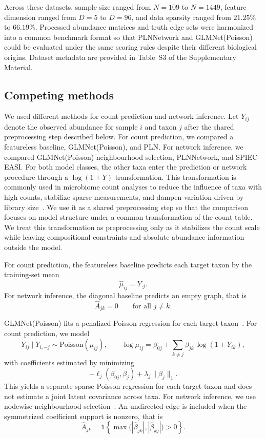 \documentclass[USenglish]{article}
\theoremstyle{dgthm}
\begin{document}
Across these datasets, sample size ranged from $N=109$ to $N=1449$, feature dimension ranged from $D=5$ to $D=96$, and data sparsity ranged from $21.25\%$ to $66.19\%$.
Processed abundance matrices and truth edge sets were harmonized into a common benchmark format so that PLNNetwork and GLMNet(Poisson) could be evaluated under the same scoring rules despite their different biological origins.
Dataset metadata are provided in Table~S3 of the Supplementary Material.



\subsection{Competing methods}
\label{subsec:algorithms}

We used different methods for count prediction and network inference.
Let $Y_{ij}$ denote the observed abundance for sample $i$ and taxon $j$ after the shared preprocessing step described below.
For count prediction, we compared a featureless baseline, GLMNet(Poisson), and PLN.
For network inference, we compared GLMNet(Poisson) neighbourhood selection, PLNNetwork, and SPIEC-EASI.
For both model classes, the other taxa enter the prediction or network procedure through a $\log(1+Y)$ transformation.
This transformation is commonly used in microbiome count analyses to reduce the influence of taxa with high counts, stabilize sparse measurements, and dampen variation driven by library size~\citep{booeshaghi2021log1p,doi:10.1128/mSystems.00016-19}.
We use it as a shared preprocessing step so that the comparison focuses on model structure under a common transformation of the count table.
We treat this transformation as preprocessing only as it stabilizes the count scale while leaving compositional constraints and absolute abundance information outside the model.

For count prediction, the featureless baseline predicts each target taxon by the training-set mean
\[
\hat{\mu}_{ij} = \bar{Y}_{\cdot j}.
\]
For network inference, the diagonal baseline predicts an empty graph, that is
\[
\hat{A}_{jk} = 0 \qquad \text{for all } j \neq k.
\]

GLMNet(Poisson) fits a penalized Poisson regression for each target taxon~\citep{Friedman2010}.
For count prediction, we model
\[
Y_{ij} \mid Y_{i,-j} \sim \mathrm{Poisson}(\mu_{ij}),
\qquad
\log \mu_{ij} = \beta_{0j} + \sum_{k \neq j} \beta_{jk}\,\log(1 + Y_{ik}),
\]
with coefficients estimated by minimizing
\[
-\ell_j(\beta_{0j}, \beta_j) + \lambda_j \lVert \beta_j \rVert_1.
\]
This yields a separate sparse Poisson regression for each target taxon and does not estimate a joint latent covariance across taxa.
For network inference, we use nodewise neighbourhood selection~\citep{Meinshausen2006}.
An undirected edge is included when the symmetrized coefficient support is nonzero, that is
\[
\hat{A}_{jk} = \mathbb{1}\!\left\{\max\!\big(|\hat{\beta}_{jk}|, |\hat{\beta}_{kj}|\big) > 0\right\}.
\]
\end{document}
